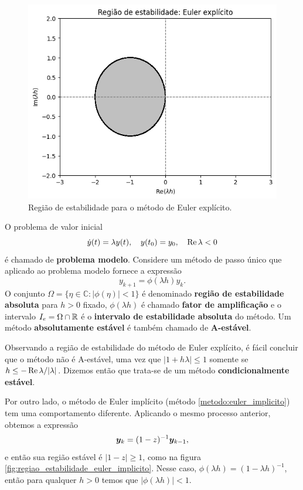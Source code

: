 \begin{figure}
    \centering
    \includegraphics[width=0.5\linewidth]{tcc//img/regiao_estabilidade_euler.png}
    \caption{Região de estabilidade para o método de Euler explícito.}
    \label{fig:regiao_estabilidade_euler_explicito}
\end{figure}

\begin{definition}
    O problema de valor inicial
    \begin{equation*}
        \dot y(t) = \lambda y(t),
        \quad
        y(t_0) = y_0,
        \quad \operatorname{\operatorname{Re}}{\lambda} < 0
    \end{equation*}
    é chamado de \textbf{problema modelo}. Considere um método de passo único que aplicado ao problema modelo fornece a expressão
    \begin{equation*}
        y_{k+1} = \phi (\lambda h) y_k.
    \end{equation*}
    O conjunto $\Omega = \{\eta \in \mathbb{C} : |\phi(\eta)| < 1 \}$ é denominado \textbf{região de estabilidade absoluta} para $h>0$ fixado, $\phi(\lambda h)$ é chamado \textbf{fator de amplificação} e o intervalo $I_e = \Omega \cap \mathbb{R}$ é o \textbf{intervalo de estabilidade absoluta} do método. Um método \textbf{absolutamente estável} é também chamado de \textbf{A-estável}.
\end{definition}

Observando a região de estabilidade do método de Euler explícito, é fácil concluir que o método não é A-estável, uma vez que $|1+h \lambda| \leq 1$ somente se $h \leq - \operatorname{\operatorname{Re}}{\lambda} / |\lambda|$. Dizemos então que trata-se de um método \textbf{condicionalmente estável}.

Por outro lado, o método de Euler implícito (método \ref{metodo:euler_implicito}) tem uma comportamento diferente. Aplicando o mesmo processo anterior, obtemos a expressão
\begin{equation}
    \bm y_k = (1 - z)^{-1} \bm y_{k-1},
\end{equation}
e então sua região estável é $|1-z| \geq 1$, como na figura \ref{fig:regiao_estabilidade_euler_implicito}. Nesse caso, $\phi (\lambda h) = (1 - \lambda h)^{-1}$, então para qualquer $h > 0$ temos que $|\phi(\lambda h)| < 1$.

